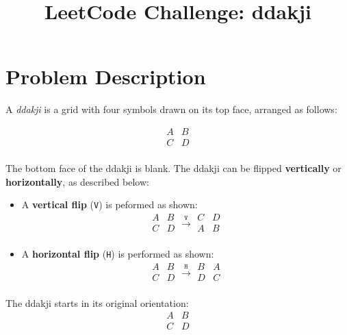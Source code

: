 \documentclass[12pt]{article}
\begin{document}
\title{\textbf{LeetCode Challenge: ddakji}}
\author{}
\date{}
\maketitle

\section*{Problem Description}

A \textit{ddakji} is a grid with four symbols drawn on its top face, arranged as follows:

\[
\begin{array}{cc}
A & B \\
C & D \\
\end{array}
\]

The bottom face of the ddakji is blank. The ddakji can be flipped \textbf{vertically} or \textbf{horizontally}, as described below:

\begin{itemize}
    \item A \textbf{vertical flip} (\texttt{V}) is peformed as shown:
    \[
    \begin{array}{cc}
    A & B \\
    C & D \\
    \end{array}
    \xrightarrow{\texttt{V}}
    \begin{array}{cc}
    C & D \\
    A & B \\
    \end{array}
    \]
    \item A \textbf{horizontal flip} (\texttt{H}) is performed as shown:
    \[
    \begin{array}{cc}
    A & B \\
    C & D \\
    \end{array}
    \xrightarrow{\texttt{H}}
    \begin{array}{cc}
    B & A \\
    D & C \\
    \end{array}
    \]
\end{itemize}

The ddakji starts in its original orientation:
\[
\begin{array}{cc}
A & B \\
C & D \\
\end{array}
\]
\end{document}

